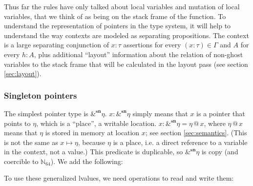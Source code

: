 \documentclass[acmsmall,nonacm]{acmart}
\newcommand*{\N}{\mathbb{N}}
\newcommand{\proves}{\vdash}
\newcommand{\makes}{\dashv}
\begin{document}
Thus far the rules have only talked about local variables and mutation of local variables, that we think of as being on the stack frame of the function. To understand the representation of pointers in the type system, it will help to understand the way contexts are modeled as separating propositions. The context is a large separating conjunction of $\boxed{x:\tau}$ assertions for every $(x:\tau)\in\Gamma$ and $A$ for every $h:A$, plus additional ``layout'' information about the relation of non-ghost variables to the stack frame that will be calculated in the layout pass (see section \ref{sec:layout}).

\subsubsection{Singleton pointers}

The simplest pointer type is $\&^\mathbf{sn}\eta$. $x:\&^\mathbf{sn}\eta$ simply means that $x$ is a pointer that points to $\eta$, which is a ``place'', a writable location. $\boxed{x:\&^\mathbf{sn}\eta}=\eta\mathrel{@}x$, where $\eta\mathrel{@}x$ means that $\eta$ is stored in memory at location $x$; see section \ref{sec:semantics}. (This is not the same as $x\mapsto\eta$, because $\eta$ is a place, i.e. a direct reference to a variable in the context, not a value.) This predicate is duplicable, so $\&^\mathbf{sn}\eta$ is \textsf{copy} (and coercible to $\N_{64}$). We add the following:

To use these generalized lvalues, we need operations to read and write them:

\end{document}
